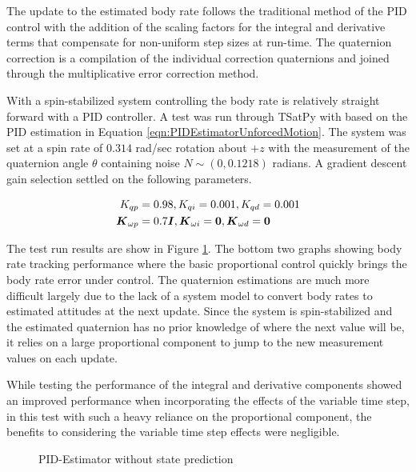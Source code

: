 The update to the estimated body rate follows the traditional method of the PID control with the addition of the scaling factors for the integral and derivative terms that compensate for non-uniform step sizes at run-time.  The quaternion correction is a compilation of the individual correction quaternions and joined through the multiplicative error correction method.

With a spin-stabilized system controlling the body rate is relatively straight forward with a PID controller.  A test was run through TSatPy with based on the PID estimation in Equation \ref{eqn:PIDEstimatorUnforcedMotion}.  The system was set at a spin rate of $0.314$ rad/sec rotation about $+z$ with the measurement of the quaternion angle $\theta$ containing noise $N \sim (0, 0.1218)$ radians.  A gradient descent gain selection settled on the following parameters.

\begin{equation}
  \begin{aligned}
    K_{qp} &= 0.98, K_{qi} = 0.001, K_{qd} = 0.001 \\
    \boldsymbol{K}_{\omega p} &= 0.7 \boldsymbol{I}, \boldsymbol{K}_{\omega i} = \boldsymbol{0}, \boldsymbol{K}_{\omega d} = \boldsymbol{0}
  \end{aligned}
\end{equation}

The test run results are show in Figure \ref{fig:PIDEstimatorwithoutstateprediction}.  The bottom two graphs showing body rate tracking performance where the basic proportional control quickly brings the body rate error under control.  The quaternion estimations are much more difficult largely due to the lack of a system model to convert body rates to estimated attitudes at the next update.  Since the system is spin-stabilized and the estimated quaternion has no prior knowledge of where the next value will be, it relies on a large proportional component to jump to the new measurement values on each update.

While testing the performance of the integral and derivative components showed an improved performance when incorporating the effects of the variable time step, in this test with such a heavy reliance on the proportional component, the benefits to considering the variable time step effects were negligible.

\begin{figure}[H]
  \centerline{}
  \caption{PID-Estimator without state prediction}
  \label{fig:PIDEstimatorwithoutstateprediction}
\end{figure}


